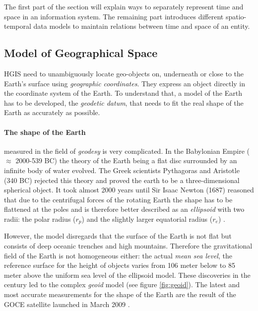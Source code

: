 The first part of the section will explain ways to separately represent time and space in an information system. The remaining part introduces different spatio-temporal data models to maintain relations between time and space of an entity.


\subsection{Model of Geographical Space} %
\label{sub:model_of_geographical_space}

HGIS need to unambiguously locate geo-objects on, underneath or close to the Earth's surface using \emph{geographic coordinates}. They express an object directly in the coordinate system of the Earth. To understand that, a model of the Earth has to be developed, the \emph{geodetic datum}, that needs to fit the real shape of the Earth as accurately as possible.

\paragraph{The shape of the Earth} %
\label{par:the_shape_of_the_earth}

measured in the field of \emph{geodesy} is very complicated. In the Babylonian Empire ($\approx$ 2000-539 BC) the theory of the Earth being a flat disc surrounded by an infinite body of water
evolved. The Greek scientists Pythagoras and Aristotle (340 BC) rejected this theory and proved the earth to be a three-dimensional spherical object. It took almost 2000 years until Sir Isaac Newton (1687) reasoned that due to the centrifugal forces of the rotating Earth the shape has to be flattened at the poles and is therefore better described as an \emph{ellipsoid} with two radii: the polar radius ($r_p$) and the slightly larger equatorial radius ($r_e$)
\cite[pp. 69-77]{bolstad2008gis}.

However, the model disregards that the surface of the Earth is not flat but consists of deep oceanic trenches and high mountains. Therefore the gravitational field of the Earth is not homogeneous either: the actual \emph{mean sea level}, the reference surface for the height of objects varies from 106 meter below to 85 meter above the uniform sea level of the ellipsoid model. These discoveries in the  century led to the complex \emph{geoid} model (see figure \ref{fig:geoid}). The latest and most accurate measurements for the shape of the Earth are the result of the GOCE satellite launched in March 2009
\cite{geoid, geoidESRI}.


